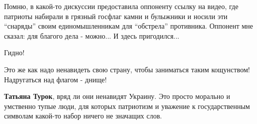 \begin{itemize}

Помню, в какой-то дискуссии предоставила оппоненту ссылку на видео, где
патриоты набирали в грязный госфлаг камни и булыжники и носили эти
\enquote{снаряды} своим единомышленникам для \enquote{обстрела} противника.
Оппонент мне сказал: для благого дела - можно... И здесь пригодился...


Гидно!


Это же как надо ненавидеть свою страну, чтобы заниматься таким кощунством!
Надругаться над флагом - днище!


\textbf{Татьяна Турок}, вряд ли они ненавидят Украину. Это просто морально и умственно
тупые люди, для которых патриотизм и уважение к государственным символам
какой-то набор ничего не значащих слов.

\end{itemize}
